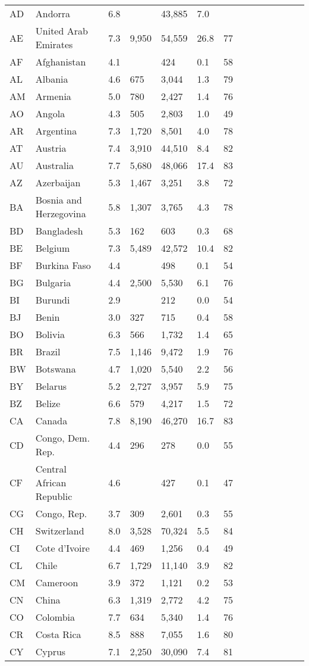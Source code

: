 \begin{scriptsize}
\begin{center}
\begin{longtable}{llllllllllllll}
AD&Andorra&6.8&&43,885&7.0&\\
AE&United Arab Emirates&7.3&9,950&54,559&26.8&77\\
AF&Afghanistan&4.1&&424&0.1&58\\
AL&Albania&4.6&675&3,044&1.3&79\\
AM&Armenia&5.0&780&2,427&1.4&76\\
AO&Angola&4.3&505&2,803&1.0&49\\
AR&Argentina&7.3&1,720&8,501&4.0&78\\
AT&Austria&7.4&3,910&44,510&8.4&82\\
AU&Australia&7.7&5,680&48,066&17.4&83\\
AZ&Azerbaijan&5.3&1,467&3,251&3.8&72\\
BA&Bosnia and Herzegovina&5.8&1,307&3,765&4.3&78\\
BD&Bangladesh&5.3&162&603&0.3&68\\
BE&Belgium&7.3&5,489&42,572&10.4&82\\
BF&Burkina Faso&4.4&&498&0.1&54\\
BG&Bulgaria&4.4&2,500&5,530&6.1&76\\
BI&Burundi&2.9&&212&0.0&54\\
BJ&Benin&3.0&327&715&0.4&58\\
BO&Bolivia&6.3&566&1,732&1.4&65\\
BR&Brazil&7.5&1,146&9,472&1.9&76\\
BW&Botswana&4.7&1,020&5,540&2.2&56\\
BY&Belarus&5.2&2,727&3,957&5.9&75\\
BZ&Belize&6.6&579&4,217&1.5&72\\
CA&Canada&7.8&8,190&46,270&16.7&83\\
CD&Congo, Dem. Rep.&4.4&296&278&0.0&55\\
CF&Central African Republic&4.6&&427&0.1&47\\
CG&Congo, Rep.&3.7&309&2,601&0.3&55\\
CH&Switzerland&8.0&3,528&70,324&5.5&84\\
CI&Cote d'Ivoire&4.4&469&1,256&0.4&49\\
CL&Chile&6.7&1,729&11,140&3.9&82\\
CM&Cameroon&3.9&372&1,121&0.2&53\\
CN&China&6.3&1,319&2,772&4.2&75\\
CO&Colombia&7.7&634&5,340&1.4&76\\
CR&Costa Rica&8.5&888&7,055&1.6&80\\
CY&Cyprus&7.1&2,250&30,090&7.4&81\\

\end{longtable}
\end{center}
\end{scriptsize}
